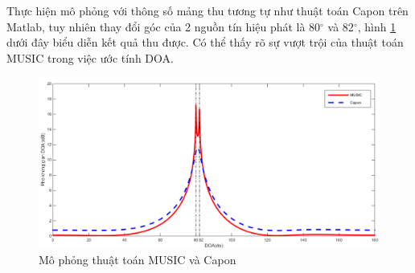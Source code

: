 Thực hiện mô phỏng với thông số mảng thu tương tự như thuật toán Capon trên Matlab, tuy nhiên thay đổi góc của 2 nguồn tín hiệu phát là 80$^{\circ}$ và 82$^{\circ}$, hình \ref{fig:MUSICvsCapon} dưới đây biểu diễn kết quả thu được. Có thể thấy rõ sự vượt trội của thuật toán MUSIC trong việc ước tính DOA.
\begin{figure} [!htb]
	\centering
	\includegraphics[width=1\linewidth]{figures/MUSICvsCapon.png}
	\caption{Mô phỏng thuật toán MUSIC và Capon}
	\label{fig:MUSICvsCapon}
\end{figure}